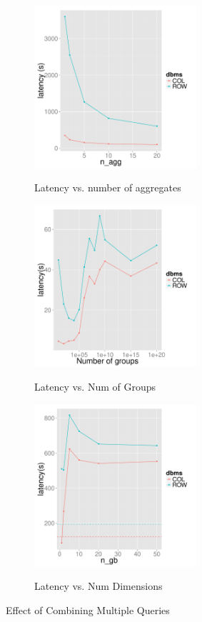 \begin{figure}[t]
	\centering
	\begin{subfigure}{0.33\linewidth}
		{\includegraphics[width=6cm] {Images/multi_agg.pdf}}
		\caption{Latency vs. number of aggregates}
		\label{fig:multi_agg}
	\end{subfigure}
	\begin{subfigure}{0.33\linewidth}
		\centering
		{\includegraphics[width=6cm] {Images/multi_gb_same.pdf}}
		\caption{Latency vs. Num of Groups}
		\label{fig:multi_gb_same}
	\end{subfigure}
	\begin{subfigure}{0.33\linewidth}
		\centering
		{\includegraphics[width=6cm] {Images/multi_gb.pdf}}
		\caption{Latency vs. Num Dimensions}
		\label{fig:multi_gb_bp}
	\end{subfigure}
	\caption{Effect of Combining Multiple Queries}
	\label{fig:bank_perf}
\end{figure}

